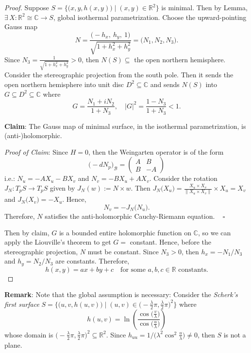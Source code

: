 \begin{proof}
Suppose $S = \big\{\big(x, y, h(x, y)\big) \mid (x, y)\in\mathbb{R}^2\big\}$ is minimal. Then by Lemma, $\exists\, X: \mathbb{R}^2\cong\mathbb{C}\to S$, global isothermal parametrization. Choose the upward-pointing Gauss map
\[
N = \frac{\big(-h_x,\ h_y,\ 1\big)}{\sqrt{1 + h_x^2 + h_y^2}} = \big(N_1, N_2, N_3\big).
\]
Since $N_3 = \frac{1}{\sqrt{1 + h_x^2 + h_y^2}} > 0$, then $N(S)\subseteq$ the open northern hemisphere. Consider the stereographic projection from the south pole. Then it sends the open northern hemisphere into unit disc $D^2\subseteq\mathbb{C}$ and sends $N(S)$ into $G\subseteq D^2 \subseteq \mathbb{C}$ where
\[
G = \frac{N_1 + iN_2}{1 + N_3}, \quad |G|^2 = \frac{1 - N_3}{1 + N_3} < 1.
\]

\noindent\textbf{Claim}: The Gauss map of minimal surface, in the isothermal parametrization, is (anti-)holomorphic.

\noindent\textit{Proof of Claim}: Since $H = 0$, then the Weingarten operator is of the form
\[
\big(-dN_p\big)_\mathcal{B} = \begin{pmatrix}A & B\\ B & -A\end{pmatrix}
\]
i.e.: $N_u = -AX_u - BX_v$ and $N_v = -BX_u + AX_v$. Consider the rotation $J_N: T_pS\to T_pS$ given by $J_N(w) := N\times w$. Then $J_N\big(X_u\big) = \frac{X_u\times X_v}{\|X_u\times X_v\|}\times X_u = X_v$ and $J_N\big(X_v\big) = -X_u$. Hence,
\[
N_v = -J_N\big(N_u\big).
\]
Therefore, $N$ satisfies the anti-holomorphic Cauchy-Riemann equation. $\;\;\;\square$

\noindent Then by claim, $G$ is a bounded entire holomorphic function on $\mathbb{C}$, so we can apply the Liouville's theorem to get $G = $ constant. Hence, before the stereographic projection, $N$ must be constant. Since $N_3 > 0$, then $h_x = -N_1/N_3$ and $h_y = N_2/N_3$ are constants. Therefore,
\[
h(x, y) = ax + by + c \quad\text{for some } a, b, c\in\mathbb{R}\text{ constants.}
\]
\end{proof}

\noindent\textbf{Remark}: Note that the global assumption is necessary: Consider the \textit{Scherk's first surface} $S = \big\{\big(u, v, h(u, v)\big) \mid (u, v)\in\big(-\frac{\lambda}{2}\pi, \frac{\lambda}{2}\pi\big)^2\big\}$ where
\[
h(u, v) = \ln\left(\frac{\cos\big(\frac{v}{\lambda}\big)}{\cos\big(\frac{u}{\lambda}\big)}\right)
\]
whose domain is $\big(-\frac{\lambda}{2}\pi, \frac{\lambda}{2}\pi\big)^2\subseteq\mathbb{R}^2$. Since $h_{uu} = 1/\big(\lambda^2\cos^2\frac{u}{\lambda}\big)\neq 0$, then $S$ is not a plane.

